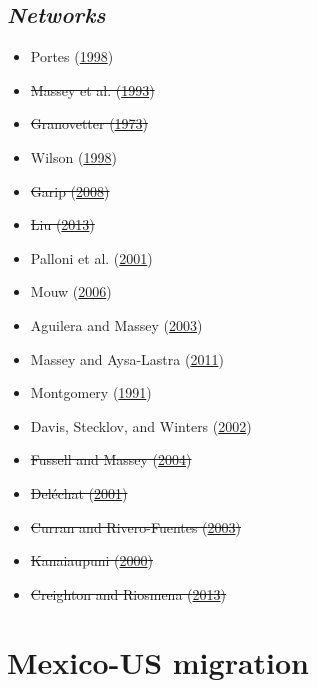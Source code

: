 \documentclass[
]{article}
\providecommand{\tightlist}{%
  \setlength{\itemsep}{0pt}\setlength{\parskip}{0pt}}
\begin{document}
\hypertarget{networks}{%
\subsection{\texorpdfstring{\emph{Networks}}{Networks}}\label{networks}}

\begin{itemize}
\tightlist
\item
  Portes (\protect\hyperlink{ref-portes1998social}{1998})
\item
  \sout{Massey et al.
  (\protect\hyperlink{ref-massey1993theories}{1993})}
\item
  \sout{Granovetter (\protect\hyperlink{ref-granovetter1973}{1973})}
\item
  Wilson (\protect\hyperlink{ref-wilson1998weak}{1998})
\item
  \sout{Garip (\protect\hyperlink{ref-garip2008social}{2008})}
\item
  \sout{Liu (\protect\hyperlink{ref-liu2013migrant}{2013})}
\item
  Palloni et al. (\protect\hyperlink{ref-palloni2001social}{2001})
\item
  Mouw (\protect\hyperlink{ref-mouw2006estimating}{2006})
\item
  Aguilera and Massey (\protect\hyperlink{ref-aguilera2003social}{2003})
\item
  Massey and Aysa-Lastra
  (\protect\hyperlink{ref-massey2011social}{2011})
\item
  Montgomery (\protect\hyperlink{ref-montgomery1991}{1991})
\item
  Davis, Stecklov, and Winters
  (\protect\hyperlink{ref-davis2002domestic}{2002})
\item
  \sout{Fussell and Massey
  (\protect\hyperlink{ref-fussell2004limits}{2004})}
\item
  \sout{Deléchat
  (\protect\hyperlink{ref-delechat2001international}{2001})}
\item
  \sout{Curran and Rivero-Fuentes
  (\protect\hyperlink{ref-curran2003engendering}{2003})}
\item
  \sout{Kanaiaupuni
  (\protect\hyperlink{ref-kanaiaupuni2000reframing}{2000})}
\item
  \sout{Creighton and Riosmena
  (\protect\hyperlink{ref-creighton2013migration}{2013})}
\end{itemize}

\hypertarget{mexico-us-migration}{%
\section{\texorpdfstring{\textbf{Mexico-US
migration}}{Mexico-US migration}}\label{mexico-us-migration}}
\end{document}
